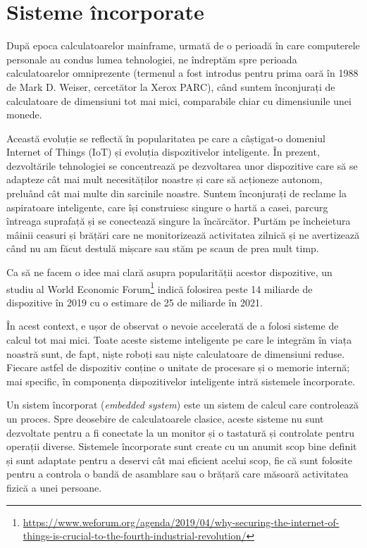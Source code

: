 \chapter{Sisteme încorporate}
\label{chapter:embed}

După epoca calculatoarelor mainframe, urmată de o perioadă în care computerele
personale au condus lumea tehnologiei, ne îndreptăm spre perioada
calculatoarelor omniprezente (termenul a fost introdus pentru prima oară în 1988
de Mark D. Weiser, cercetător la Xerox PARC), când suntem înconjurați de
calculatoare de dimensiuni tot mai mici, comparabile chiar cu dimensiunile unei
monede.

Această evoluție se reflectă în popularitatea pe care a câștigat-o domeniul
Internet of Things (IoT)  și evoluția
dispozitivelor inteligente. În prezent, dezvoltările tehnologiei se concentrează
pe dezvoltarea unor dispozitive care să se adapteze cât mai mult necesităților
noastre și care să acționeze autonom, preluând cât mai multe din sarcinile
noastre. Suntem înconjurați de reclame la aspiratoare inteligente, care își
construiesc singure o hartă a casei, parcurg întreaga suprafață și se conectează
singure la încărcător. Purtăm pe încheietura mâinii ceasuri și brățări care ne
monitorizează activitatea zilnică și ne avertizează când nu am făcut destulă
mișcare sau stăm pe scaun de prea mult timp.

Ca să ne facem o idee mai clară asupra popularității acestor dispozitive, un
studiu al World Economic Forum\footnote{\url{https://www.weforum.org/agenda/2019/04/why-securing-the-internet-of-things-is-crucial-to-the-fourth-industrial-revolution/}} indică folosirea peste 14 miliarde de dispozitive în 2019 cu o estimare de 25 de miliarde în 2021.

În acest context, e ușor de observat o nevoie accelerată de a folosi sisteme de
calcul tot mai mici. Toate aceste sisteme inteligente pe care le integrăm
în viața noastră sunt, de fapt, niște roboți sau niște
calculatoare de dimensiuni reduse. Fiecare astfel de dispozitiv conține o
unitate de procesare și o memorie internă; mai specific, în componența
dispozitivelor inteligente intră sistemele încorporate.

Un sistem încorporat (\textit{embedded system}) este un sistem de calcul care controlează un proces. Spre
deosebire de calculatoarele clasice, aceste sisteme nu sunt dezvoltate pentru a
fi conectate la un monitor și o tastatură și controlate pentru operații diverse.
Sistemele încorporate sunt create cu un anumit scop bine definit și sunt
adaptate pentru a deservi cât mai eficient acelui scop, fie că sunt folosite
pentru a controla o bandă de asamblare sau o brățară care măsoară activitatea
fizică a unei persoane.

